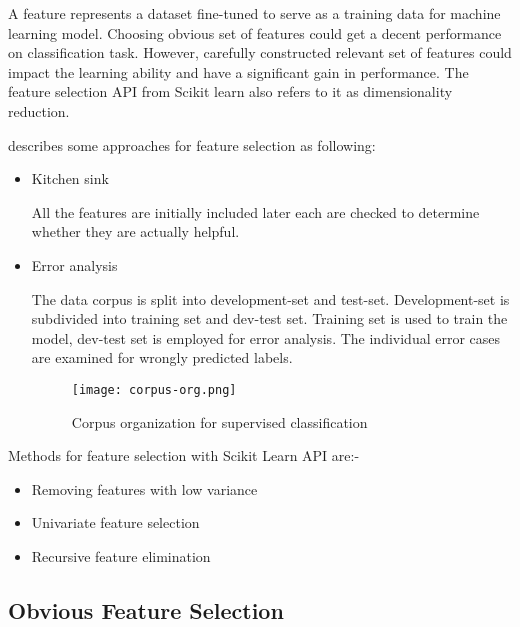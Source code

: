 A feature represents a dataset fine-tuned to serve as a training data for machine learning model. Choosing obvious set of features could get a decent performance on classification task. However, carefully constructed relevant set of features could impact the learning ability and have a significant gain in performance. The feature selection API from Scikit learn \parencite{sklearn_api} also refers to it as dimensionality reduction. 

\parencite{BirdKleinLoper09}  describes some approaches for feature selection as following:

\begin{itemize}
      \item Kitchen sink 
      

      All the features are initially included later each are checked to determine whether they are actually helpful.

      \item Error analysis
      
      The data corpus is split into development-set and test-set. Development-set is subdivided into training set and dev-test set. Training set is used to train the model, dev-test set is employed for error analysis.  The individual error cases are examined for wrongly predicted labels.
      
      
      \begin{figure}[H]
            \centering    
            \texttt{[image: corpus-org.png]}
            \caption{Corpus organization for supervised classification \parencite{BirdKleinLoper09}}
            \label{fig:corpus-supervised-classification}
        \end{figure}

\end{itemize}

 Methods for feature selection with Scikit Learn API are:-
\begin{itemize}
      \item Removing features with low variance
      \item Univariate feature selection
      \item Recursive feature elimination

\end{itemize}

\subsection{Obvious Feature Selection}

